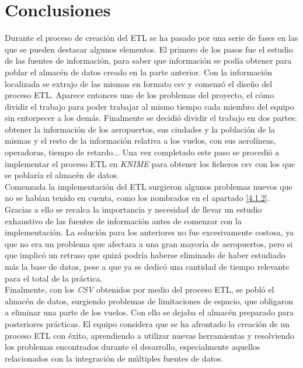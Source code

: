 \documentclass{article}
\begin{document}
\newpage
\section{Conclusiones}




Durante el proceso de creación del ETL se ha pasado por una serie de fases en las que se pueden destacar algunos elementos. El primero de los pasos fue el estudio de las fuentes de información, para saber que información se podía obtener para poblar el almacén de datos creado en la parte anterior. Con la información localizada se extrajo de las mismas en formato csv y comenzó el diseño del proceso ETL. Aparece entonces uno de los problemas del proyecto, el cómo dividir el trabajo para poder trabajar al mismo tiempo cada miembro del equipo sin entorpecer a los demás. Finalmente se decidió dividir el trabajo en dos partes: obtener la información de los aeropuertos, sus ciudades y la población de la mismas y el resto de la información relativa a los vuelos, con sus aerolíneas, operadoras, tiempo de retardo... Una vez completado este paso se procedió a implementar el proceso ETL en \textit{KNIME} para obtener los ficheros csv con los que se poblaría el almacén de datos.\\

Comenzada la implementación del ETL surgieron algunos problemas nuevos que no se habían tenido en cuenta, como los nombrados en el apartado \ref{4.1.2}. Gracias a ello se recalca la importancia y necesidad de llevar un estudio exhaustivo de las fuentes de información antes de comenzar con la implementación. La solución para los anteriores no fue excesivamente costosa, ya que no era un problema que afectara a una gran mayoría de aeropuertos, pero si que implicó un retraso que quizá podría haberse eliminado de haber estudiado más la base de datos, pese a que ya se dedicó una cantidad de tiempo relevante para el total de la práctica.\\

Finalmente, con los \textit{CSV} obtenidos por medio del proceso ETL, se pobló el almacén de datos, surgiendo problemas de limitaciones de espacio, que obligaron a eliminar una parte de los vuelos. Con ello se dejaba el almacén preparado para posteriores prácticas. El equipo considera que se ha afrontado la creación de un proceso ETL con éxito, aprendiendo a utilizar nuevas herramientas y resolviendo los problemas encontrados durante el desarrollo, especialmente aquellos relacionados con la integración de múltiples fuentes de datos.\\
\end{document}
